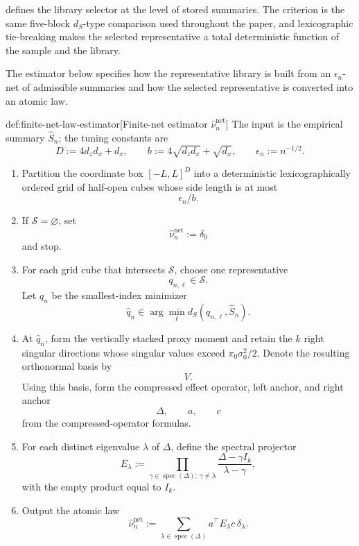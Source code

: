  defines the library selector at the level of stored summaries. The criterion is the same five-block \(d_S\)-type comparison used throughout the paper, and lexicographic tie-breaking makes the selected representative a total deterministic function of the sample and the library.

The estimator below specifies how the representative library is built from an \(\epsilon_n\)-net of admissible summaries and how the selected representative is converted into an atomic law.

\begin{algorithmv}{def:finite-net-law-estimator}[Finite-net estimator \(\widehat\nu_n^{\mathrm{net}}\)]
The input is the empirical summary \(\widehat S_n\); the tuning constants are
\[
D:=4d_zd_x+d_x,\qquad
b:=4\sqrt{d_zd_x}+\sqrt{d_x},\qquad
\epsilon_n:=n^{-1/2}.
\]
\begin{enumerate}
\item Partition the coordinate box \([-L,L]^D\) into a deterministic lexicographically ordered grid of half-open cubes whose side length is at most
\[
\epsilon_n/b.
\]

\item If \(\mathscr S=\varnothing\), set
\[
\widehat\nu_n^{\mathrm{net}}:=\delta_0
\]
and stop.

\item For each grid cube that intersects \(\mathscr S\), choose one representative
\[
q_{n,\ell}\in\mathscr S.
\]
Let \(\widehat q_n\) be the smallest-index minimizer
\[
\widehat q_n
\in
\arg\min_{\ell} d_S(q_{n,\ell},\widehat S_n).
\]

\item At \(\widehat q_n\), form the vertically stacked proxy moment and retain the \(k\) right singular directions whose singular values exceed \(\pi_0\sigma_0^2/2\). Denote the resulting orthonormal basis by
\[
V.
\]
Using this basis, form the compressed effect operator, left anchor, and right anchor
\[
\Delta,\qquad a,\qquad c
\]
from the compressed-operator formulas.

\item For each distinct eigenvalue \(\lambda\) of \(\Delta\), define the spectral projector
\[
E_\lambda
:=
\prod_{\gamma\in\operatorname{spec}(\Delta):\,\gamma\ne\lambda}
\frac{\Delta-\gamma I_k}{\lambda-\gamma},
\]
with the empty product equal to \(I_k\).

\item Output the atomic law
\[
\widehat\nu_n^{\mathrm{net}}
:=
\sum_{\lambda\in\operatorname{spec}(\Delta)}
a^\top E_\lambda c\,\delta_\lambda .
\]
\end{enumerate}
\end{algorithmv}

